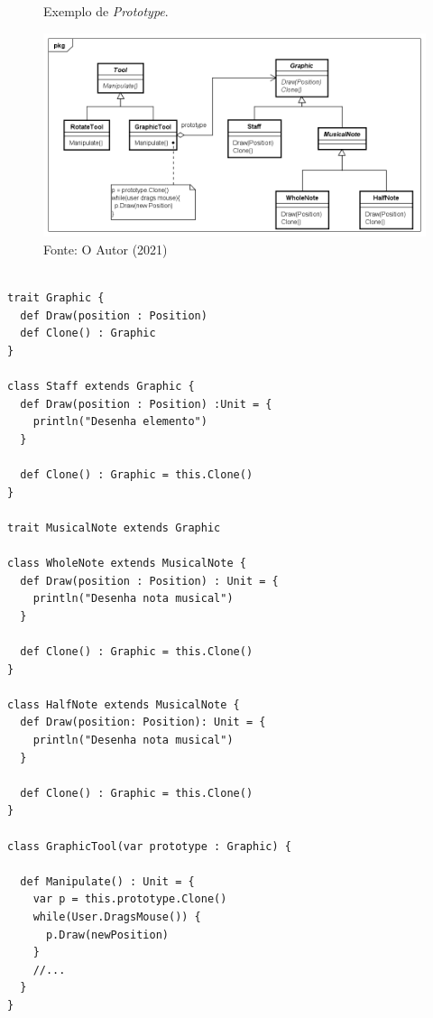 \begin{figure}[htb]
	\caption{\label{prototype_exemplo}Exemplo de \textit{Prototype}.}
	\begin{center}
	    \includegraphics[scale=0.5]{5_padroes-contexto-funcional/5.1_criacionais/5.1.4_prototype/prototype_exemplo.png}
	\end{center}
  \caption*{Fonte: O Autor (2021)}
\end{figure}

\begin{lstlisting}[caption={\textit{Prototype} Orientado a Objetos.},label=ooprototype]

trait Graphic {
  def Draw(position : Position)
  def Clone() : Graphic
}

class Staff extends Graphic {
  def Draw(position : Position) :Unit = {
    println("Desenha elemento")
  }

  def Clone() : Graphic = this.Clone()
}

trait MusicalNote extends Graphic

class WholeNote extends MusicalNote {
  def Draw(position : Position) : Unit = {
    println("Desenha nota musical")
  }

  def Clone() : Graphic = this.Clone()
}

class HalfNote extends MusicalNote {
  def Draw(position: Position): Unit = {
    println("Desenha nota musical")
  }

  def Clone() : Graphic = this.Clone()
}

class GraphicTool(var prototype : Graphic) {

  def Manipulate() : Unit = {
    var p = this.prototype.Clone()
    while(User.DragsMouse()) {
      p.Draw(newPosition)
    }
    //...
  }
}

\end{lstlisting}

